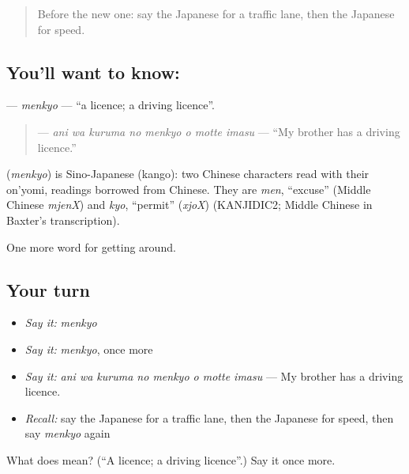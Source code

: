 \begin{quote}
Before the new one: say the Japanese for a traffic lane, then the Japanese for speed.
\end{quote}

\subsection*{You'll want to know: }
\textbf{} — \emph{menkyo} — \textquotedblleft{}a licence; a driving licence\textquotedblright{}.

\begin{quote}
\textbf{   } — \emph{ani wa kuruma no menkyo o motte imasu} — \textquotedblleft{}My brother has a driving licence.\textquotedblright{}
\end{quote}

\begin{cousinweb}
\textbf{} (\emph{menkyo}) is Sino-Japanese (kango): two Chinese characters read with their on'yomi, readings borrowed from Chinese. They are \emph{men}, \textquotedblleft{}excuse\textquotedblright{} (Middle Chinese \emph{mjenX}) and \emph{kyo}, \textquotedblleft{}permit\textquotedblright{} (\emph{xjoX}) (KANJIDIC2; Middle Chinese in Baxter's transcription).
\end{cousinweb}

\begin{grammarlens}[title={What you've built}]
One more word for getting around.
\end{grammarlens}

\subsection*{Your turn}
\begin{itemize}
\raggedright
  \item \emph{Say it:} \emph{menkyo}
  \item \emph{Say it:} \emph{menkyo}, once more
  \item \emph{Say it:} \emph{ani wa kuruma no menkyo o motte imasu} — My brother has a driving licence.
  \item \emph{Recall:} say the Japanese for a traffic lane, then the Japanese for speed, then say \emph{menkyo} again
\end{itemize}

\begin{tcolorbox}[breakable,colback=teal!4,colframe=teal!35!black,title={Before you move on}]
What does  mean? (\textquotedblleft{}A licence; a driving licence\textquotedblright{}.) Say it once more.
\end{tcolorbox}
